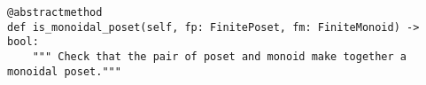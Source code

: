 \begin{verbatim}
@abstractmethod
def is_monoidal_poset(self, fp: FinitePoset, fm: FiniteMonoid) -> bool:
    """ Check that the pair of poset and monoid make together a monoidal poset."""
\end{verbatim}